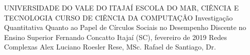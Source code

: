 
\begin{Info}
{UNIVERSIDADE DO VALE DO ITAJAÍ}
{ESCOLA DO MAR, CIÊNCIA E TECNOLOGIA}
{CURSO DE CIÊNCIA DA COMPUTAÇÂO}
{Investigação Quantitativa Quanto ao Papel de Círculos Sociais no Desempenho Discente no Ensino Superior}
{Fernando Concatto}
{Itajaí (SC), fevereiro de 2019}
{Redes Complexas}
{Alex Luciano Roesler Rese, MSc.}
{Rafael de Santiago, Dr.}
\end{Info}





